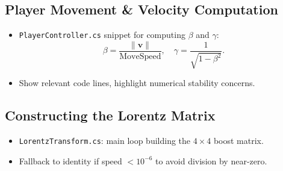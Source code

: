 \documentclass[a4paper]{article}
\begin{document}
\subsection{Player Movement \& Velocity Computation}
\begin{itemize}
  \item \texttt{PlayerController.cs} snippet for computing \(\beta\) and \(\gamma\):
  \[
    \beta = \frac{\|\mathbf{v}\|}{\text{MoveSpeed}}, 
    \quad
    \gamma = \frac{1}{\sqrt{1 - \beta^2}}.
  \]
  \item Show relevant code lines, highlight numerical stability concerns.
\end{itemize}

\subsection{Constructing the Lorentz Matrix}
\begin{itemize}
  \item \texttt{LorentzTransform.cs}: main loop building the $4\times4$ boost matrix.
  \item Fallback to identity if speed $<\!10^{-6}$ to avoid division by near-zero.
\end{itemize}


\end{document}
